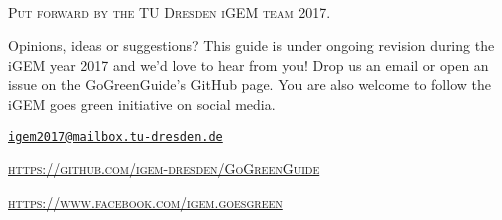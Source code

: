 \documentclass[11pt,fleqn,openany]{book} %
\begin{document}
	\begin{flushright}
			\\\bigskip
		
		\noindent \textsc{Put forward by the TU Dresden iGEM team 2017.}\\\bigskip
		
		\noindent Opinions, ideas or suggestions? This guide is under ongoing revision during the iGEM year 2017 and we'd love to hear from you! Drop us an email or open an issue on the GoGreenGuide's GitHub page. You are also welcome to follow the iGEM goes green initiative on social media.\\\bigskip
		
		\noindent \texttt{\href{mailto:igem2017@mailbox.tu-dresden.de}{igem2017@mailbox.tu-dresden.de}}
		
		\noindent \textsc{\url{https://github.com/igem-dresden/GoGreenGuide}}
		
		\noindent \textsc{\url{https://www.facebook.com/igem.goesgreen}}
	\end{flushright}\vspace{-\bigskipamount}
	\pagestyle{empty} %
	\tableofcontents %
	\pagestyle{fancy} %
	
	
	
	
	
	
	
	

	
	
\end{document}
